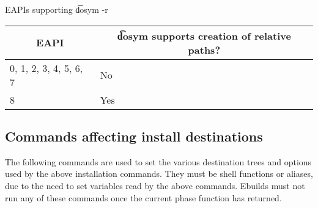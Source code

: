 \begin{centertable}{EAPIs supporting \t{dosym -r}}
    \label{tab:dosym-r}
    \begin{tabular}{ll}
      \toprule
      \multicolumn{1}{c}{\textbf{EAPI}} &
      \multicolumn{1}{c}{\textbf{\t{dosym} supports creation of relative paths?}} \\
      \midrule
      0, 1, 2, 3, 4, 5, 6, 7  & No  \\
      8                       & Yes \\
      \bottomrule
    \end{tabular}
\end{centertable}

\subsection{Commands affecting install destinations}
The following commands are used to set the various destination trees and options used by the above
installation commands. They must be shell functions or aliases, due to the need to set variables
read by the above commands. Ebuilds must not run any of these commands once the current phase
function has returned.

